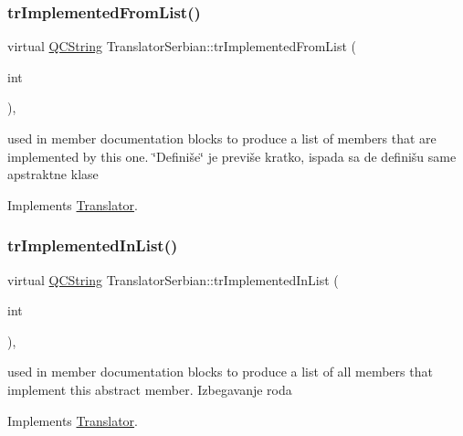 \subsubsection{\texorpdfstring{trImplementedFromList()}{trImplementedFromList()}}
{\footnotesize\ttfamily virtual \mbox{\hyperlink{class_q_c_string}{Q\+C\+String}} Translator\+Serbian\+::tr\+Implemented\+From\+List (\begin{DoxyParamCaption}\item[{int}]{ }\end{DoxyParamCaption})\hspace{0.3cm}{\ttfamily [inline]}, {\ttfamily [virtual]}}

used in member documentation blocks to produce a list of members that are implemented by this one. \char`\"{}\+Definiše\char`\"{} je previše kratko, ispada sa de definišu same apstraktne klase

Implements \mbox{\hyperlink{class_translator}{Translator}}.

\mbox{\label{class_translator_serbian_a77b2ac1eb4a418d192e0a1ed04fb8f63}} 
\subsubsection{\texorpdfstring{trImplementedInList()}{trImplementedInList()}}
{\footnotesize\ttfamily virtual \mbox{\hyperlink{class_q_c_string}{Q\+C\+String}} Translator\+Serbian\+::tr\+Implemented\+In\+List (\begin{DoxyParamCaption}\item[{int}]{ }\end{DoxyParamCaption})\hspace{0.3cm}{\ttfamily [inline]}, {\ttfamily [virtual]}}

used in member documentation blocks to produce a list of all members that implement this abstract member. Izbegavanje roda

Implements \mbox{\hyperlink{class_translator}{Translator}}.

\mbox{\label{class_translator_serbian_a65accb1969f0430fcbc5f1e48a36524a}} 
